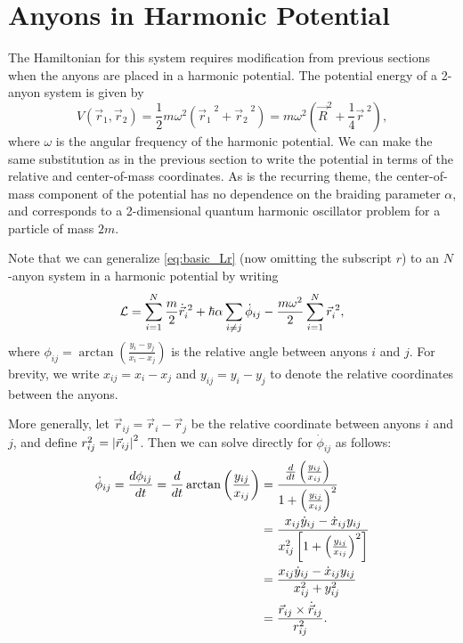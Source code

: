\section{Anyons in Harmonic Potential}\label{sec:mult_harmonic}

The Hamiltonian for this system requires modification from previous sections when the anyons are placed in a harmonic potential. The potential energy of a 2-anyon system is given by
\begin{equation}
    V(\vec{r}_1,\vec{r}_2) = \frac{1}{2}m\omega^2\left( {\vec{r}_1}^{\;2} + {\vec{r}_2}^{\;2} \right) = m\omega^2\left( {\vec{R}}^2 + \frac{1}{4}{\vec{r}}^{\;2} \right),
\end{equation}
where $\omega$ is the angular frequency of the harmonic potential. We can make the same substitution as in the previous section to write the potential in terms of the relative and center-of-mass coordinates. As is the recurring theme, the center-of-mass component of the potential has no dependence on the braiding parameter $\alpha$, and corresponds to a 2-dimensional quantum harmonic oscillator problem for a particle of mass $2m$.

Note that we can generalize \cref{eq:basic_Lr} (now omitting the subscript $r$) to an $N$-anyon system in a harmonic potential by writing
\begin{equation}
    \mathcal{L} = \sum_{i=1}^{N}\frac{m}{2}\dot{\vec{r}}_i^{\;2} + \hbar\alpha\sum_{i\neq j}\dot{\phi}_{ij} - \frac{m\omega^2}{2}\sum_{i=1}^{N}{\vec{r}_i}^{\;2},
\end{equation}
where $\phi_{ij} = \arctan\left( \frac{y_i-y_j}{x_i-x_j} \right)$ is the relative angle between anyons $i$ and $j$. For brevity, we write $x_{ij} = x_i-x_j$ and $y_{ij} = y_i-y_j$ to denote the relative coordinates between the anyons.

More generally, let $\vec{r}_{ij} = \vec{r}_i - \vec{r}_j$ be the relative coordinate between anyons $i$ and $j$, and define $r_{ij}^2 = \left|{\vec{r}_{ij}}\right|^2$. Then we can solve directly for $\dot{\phi}_{ij}$ as follows:
\begin{align*}
    \dot{\phi}_{ij} = \frac{d\phi_{ij}}{dt} = \frac{d}{dt}\arctan\left( \frac{y_{ij}}{x_{ij}} \right)
        &= \frac{\frac{d}{dt}\left( \frac{y_{ij}}{x_{ij}} \right)}{1+{\left( \frac{y_{ij}}{x_{ij}} \right)}^2} \\
        &= \frac{x_{ij}\dot{y}_{ij} - \dot{x}_{ij}y_{ij}}{x_{ij}^2\left[ 1+{\left( \frac{y_{ij}}{x_{ij}} \right)}^2 \right]} \\
        &= \frac{x_{ij}\dot{y}_{ij} - \dot{x}_{ij}y_{ij}}{x_{ij}^2 + y_{ij}^2} \\
        &= \frac{\vec{r}_{ij}\times\dot{\vec{r}}_{ij}}{r_{ij}^2}.
\end{align*}

